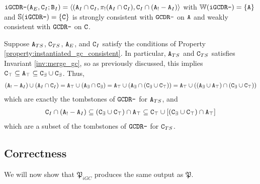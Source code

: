 \begin{example}
\label{ex:instantiated:dr-}
$\tt{iGCDR-}(\tt{A}_E, \tt{C}_I; \tt{B}_I) = \langle (\tt{A}_I \cap \tt{C}_I, \pi_!(\tt{A}_I \cap \tt{C}_I), \tt{C}_I \cap (\tt{A}_! - \tt{A}_I)\rangle$ with $\mathbb{W}(\tt{iGCDR-}) = \{\tt{A}\}$ and $\mathbb{S}(\tt{iGCDR-}) = \{\tt{C}\}$ is strongly consistent with $\tt{GCDR-}$ on $\tt{A}$ and weakly consistent with $\tt{GCDR-}$ on $\tt{C}$.
\end{example}
Suppose $\tt{A}_{TS}$, $\tt{C}_{TS}$, $\tt{A}_E$, and $\tt{C}_I$ satisfy the conditions of Property \ref{property:instantiated_gc_consistent}.
In particular, $\tt{A}_{TS}$ and $\tt{C}_{TS}$ satisfies Invariant \ref{inv:merge_gc}, so as previously discussed, this implies $\tt{C}_\top \subseteq \tt{A}_\top \subseteq \tt{C}_\exists \cup \tt{C}_\exists$.
Thus,
\begin{align*}
(\tt{A}_! - \tt{A}_I) \cup (\tt{A}_I \cap \tt{C}_I)
= \tt{A}_\top \cup (\tt{A}_\exists \cap \tt{C}_\exists)
= \tt{A}_\top \cup (\tt{A}_\exists \cap (\tt{C}_\exists \cup \tt{C}_\top))
= \tt{A}_\top \cup ((\tt{A}_\exists \cup \tt{A}_\top) \cap (\tt{C}_\exists \cup \tt{C}_\top))
\end{align*}
which are exactly the tombstones of $\tt{GCDR-}$ for $\tt{A}_{TS}$, and
\begin{align*}
\tt{C}_I \cap (\tt{A}_! - \tt{A}_I) \subseteq (\tt{C}_\exists \cup \tt{C}_\top) \cap \tt{A}_\top \subseteq \tt{C}_\top \cup [(\tt{C}_\exists \cup \tt{C}_\top) \cap \tt{A}_\top]
\end{align*}
which are a subset of the tombstones of $\tt{GCDR-}$ for $\tt{C}_{TS}$.


\subsection{Correctness}
We will now show that $\mathfrak{P}_{iGC}$ produces the same output as $\mathfrak{P}$.

